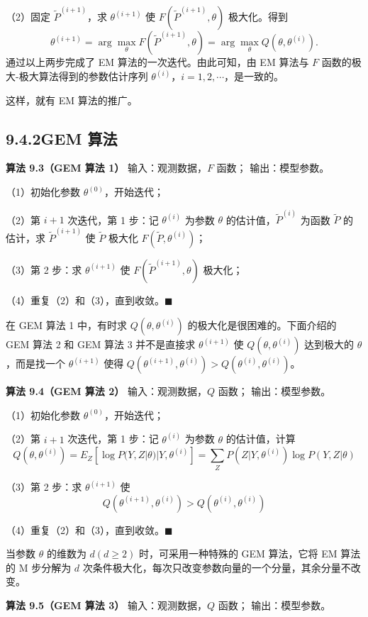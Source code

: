 \documentclass[UTF8,12pt,a4paper,fontset=fandol]{ctexart}
\begin{document}
（2）固定 $\tilde{P}^{(i+1)}$，求 $\theta^{(i+1)}$ 使 $F(\tilde{P}^{(i+1)},\theta)$ 极大化。得到
\[
  \theta^{(i+1)}=\arg\max_{\theta}F(\tilde{P}^{(i+1)},\theta)
  =\arg\max_{\theta}Q(\theta,\theta^{(i)}).
\]
通过以上两步完成了 EM 算法的一次迭代。由此可知，由 EM 算法与 $F$ 函数的极大-极大算法得到的参数估计序列 $\theta^{(i)}$，$i=1,2,\cdots$，是一致的。

这样，就有 EM 算法的推广。

\subsection*{9.4.2\quad GEM 算法}

\noindent\textbf{算法 9.3（GEM 算法 1）}\quad
输入：观测数据，$F$ 函数；
输出：模型参数。

（1）初始化参数 $\theta^{(0)}$，开始迭代；

（2）第 $i+1$ 次迭代，第 1 步：记 $\theta^{(i)}$ 为参数 $\theta$ 的估计值，$\tilde{P}^{(i)}$ 为函数 $\tilde{P}$ 的估计，求 $\tilde{P}^{(i+1)}$ 使 $\tilde{P}$ 极大化 $F(\tilde{P},\theta^{(i)})$；

（3）第 2 步：求 $\theta^{(i+1)}$ 使 $F(\tilde{P}^{(i+1)},\theta)$ 极大化；

（4）重复（2）和（3），直到收敛。\hfill$\blacksquare$

在 GEM 算法 1 中，有时求 $Q(\theta,\theta^{(i)})$ 的极大化是很困难的。下面介绍的 GEM 算法 2 和 GEM 算法 3 并不是直接求 $\theta^{(i+1)}$ 使 $Q(\theta,\theta^{(i)})$ 达到极大的 $\theta$，而是找一个 $\theta^{(i+1)}$ 使得 $Q(\theta^{(i+1)},\theta^{(i)})>Q(\theta^{(i)},\theta^{(i)})$。

\noindent\textbf{算法 9.4（GEM 算法 2）}\quad
输入：观测数据，$Q$ 函数；
输出：模型参数。

（1）初始化参数 $\theta^{(0)}$，开始迭代；

（2）第 $i+1$ 次迭代，第 1 步：记 $\theta^{(i)}$ 为参数 $\theta$ 的估计值，计算
\[
Q(\theta,\theta^{(i)})=E_Z[\log P(Y,Z|\theta)|Y,\theta^{(i)}]
=\sum_ZP(Z|Y,\theta^{(i)})\log P(Y,Z|\theta)
\]

（3）第 2 步：求 $\theta^{(i+1)}$ 使
\[
Q(\theta^{(i+1)},\theta^{(i)})>Q(\theta^{(i)},\theta^{(i)})
\]

（4）重复（2）和（3），直到收敛。\hfill$\blacksquare$

当参数 $\theta$ 的维数为 $d(d\geqslant 2)$ 时，可采用一种特殊的 GEM 算法，它将 EM 算法的 M 步分解为 $d$ 次条件极大化，每次只改变参数向量的一个分量，其余分量不改变。

\noindent\textbf{算法 9.5（GEM 算法 3）}\quad
输入：观测数据，$Q$ 函数；
输出：模型参数。
\end{document}
